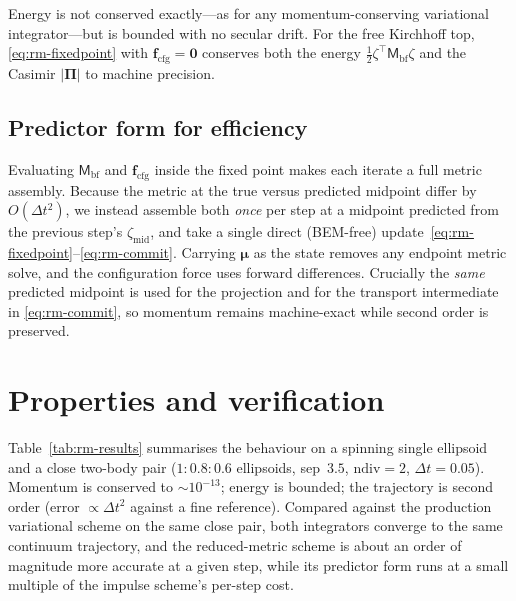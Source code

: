 \documentclass[11pt]{article}
\newcommand{\Mmat}{\mathsf{M}}
\newcommand{\PiP}{\bm{\Pi}}
\newcommand{\muv}{\bm{\mu}}
\begin{document}
Energy is not conserved exactly---as for any momentum-conserving variational
integrator---but is bounded with no secular drift. For the free Kirchhoff top,
\eqref{eq:rm-fixedpoint} with $\mathbf f_{\mathrm{cfg}}=\mathbf 0$ conserves both
the energy $\tfrac12\zeta^\top\Mmat_{\mathrm{bf}}\zeta$ and the Casimir
$|\PiP|$ to machine precision.

\subsection*{Predictor form for efficiency}
Evaluating $\Mmat_{\mathrm{bf}}$ and $\mathbf f_{\mathrm{cfg}}$ inside the
fixed point makes each iterate a full metric assembly. Because the metric at the
true versus predicted midpoint differ by $O(\Delta t^2)$, we instead assemble
both \emph{once} per step at a midpoint predicted from the previous step's
$\zeta_{\mathrm{mid}}$, and take a single direct (BEM-free)
update~\eqref{eq:rm-fixedpoint}--\eqref{eq:rm-commit}. Carrying $\muv$ as the
state removes any endpoint metric solve, and the configuration force uses
forward differences. Crucially the \emph{same} predicted midpoint is used for
the projection and for the transport intermediate in \eqref{eq:rm-commit}, so
momentum remains machine-exact while second order is preserved.

\section{Properties and verification}
\label{sec:rm-results}

Table~\ref{tab:rm-results} summarises the behaviour on a spinning single
ellipsoid and a close two-body pair ($1\!:\!0.8\!:\!0.6$ ellipsoids, sep~$3.5$,
$\mathrm{ndiv}=2$, $\Delta t=0.05$). Momentum is conserved to $\sim10^{-13}$;
energy is bounded; the trajectory is second order (error $\propto\Delta t^2$
against a fine reference). Compared against the production variational scheme on
the same close pair, both integrators converge to the same continuum trajectory,
and the reduced-metric scheme is about an order of magnitude more accurate at a
given step, while its predictor form runs at a small multiple of the impulse
scheme's per-step cost.
\end{document}
